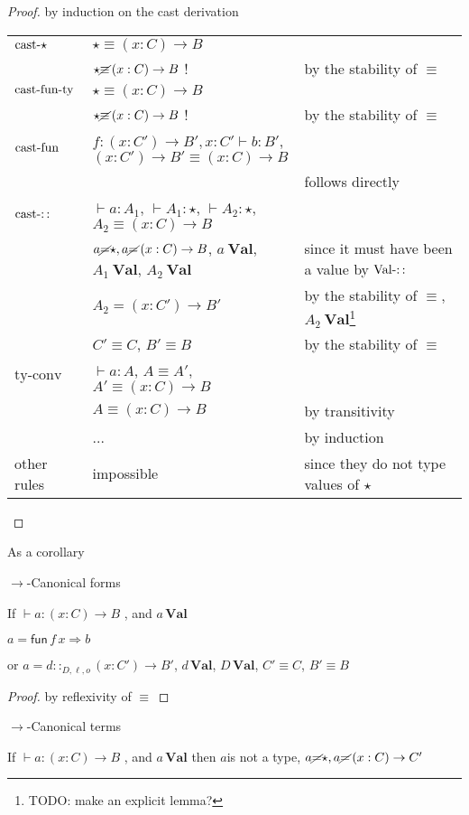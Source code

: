 \begin{proof}
by induction on the cast derivation

\begin{tabular}{lll}
$\operatorname{cast-\star}$ & $\star\equiv\left(x:C\right)\rightarrow B$ & \tabularnewline
 & $\star\cancel{\equiv}\left(x:C\right)\rightarrow B$ ! & by the stability of $\equiv$\tabularnewline
$\operatorname{cast-fun-ty}$ & $\star\equiv\left(x:C\right)\rightarrow B$ & \tabularnewline
 & $\star\cancel{\equiv}\left(x:C\right)\rightarrow B$ ! & by the stability of $\equiv$\tabularnewline
$\operatorname{cast-fun}$ & \multicolumn{2}{l}{$f:\left(x:C'\right)\rightarrow B',x:C'\vdash b:B'$, $\left(x:C'\right)\rightarrow B'\equiv\left(x:C\right)\rightarrow B$}\tabularnewline
 &  & follows directly\tabularnewline
$\operatorname{cast-::}$ & $\vdash a:A_{1}$, $\vdash A_{1}:\star$, $\vdash A_{2}:\star$, $A_{2}\equiv\left(x:C\right)\rightarrow B$ & \tabularnewline
 & $a\cancel{=}\star,a\cancel{=}\left(x:C\right)\rightarrow B$, $a\:\textbf{Val}$,
$A_{1}\:\textbf{Val}$, $A_{2}\:\textbf{Val}$ & since it must have been a value by $\operatorname{Val-::}$\tabularnewline
 & $A_{2}=\left(x:C'\right)\rightarrow B'$ & by the stability of $\equiv$, $A_{2}\:\textbf{Val}$\footnote{TODO: make an explicit lemma?}\tabularnewline
 & $C'\equiv C$, $B'\equiv B$ & by the stability of $\equiv$\tabularnewline
$\textrm{ty-conv}$ & $\vdash a:A$, $A\equiv A'$, $A'\equiv\left(x:C\right)\rightarrow B$ & \tabularnewline
 & $A\equiv\left(x:C\right)\rightarrow B$ & by transitivity\tabularnewline
 & ... & by induction\tabularnewline
other rules & impossible & since they do not type values of $\star$\tabularnewline
\end{tabular}
\end{proof}
As a corollary
\begin{cor}
$\rightarrow$-Canonical forms

If $\vdash a:\left(x:C\right)\rightarrow B$ , and $a\,\textbf{Val}$

$a=\mathsf{fun}\,f\,x\Rightarrow b$ 

or $a=d::_{D,\ensuremath{\ell},o}\left(x:C'\right)\rightarrow B'$,
$d\,\textbf{Val}$, $D\,\textbf{Val}$, $C'\equiv C$, $B'\equiv B$ 
\end{cor}

\begin{proof}
by reflexivity of $\equiv$
\end{proof}
\begin{cor}
$\rightarrow$-Canonical terms

If $\vdash a:\left(x:C\right)\rightarrow B$ , and $a\,\textbf{Val}$
then $a$is not a type, $a\cancel{=}\star,a\cancel{=}\left(x:C\right)\rightarrow C'$
\end{cor}

